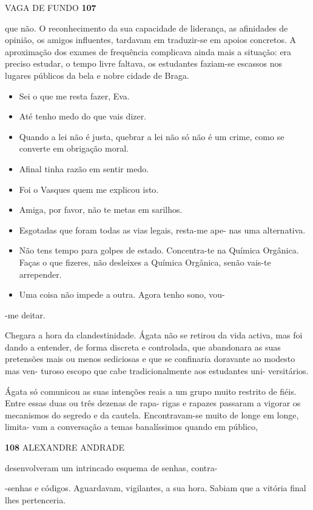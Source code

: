 VAGA DE FUNDO \textbf{107}

que não. O reconhecimento da sua capacidade de liderança, as afinidades
de opinião, os amigos influentes, tardavam em traduzir-se em apoios
concretos. A aproximação dos exames de frequência complicava ainda mais
a situação: era preciso estudar, o tempo livre faltava, os estudantes
faziam-se escassos nos lugares públicos da bela e nobre cidade de Braga.

\begin{itemize}
\tightlist
\item
  Sei o que me resta fazer, Eva.
\item
  Até tenho medo do que vais dizer.
\item
  Quando a lei não é justa, quebrar a lei não só não é um crime, como se
  converte em obrigação moral.
\item
  Afinal tinha razão em sentir medo.
\item
  Foi o Vasques quem me explicou isto.
\item
  Amiga, por favor, não te metas em sarilhos.
\item
  Esgotadas que foram todas as vias legais, resta-me ape- nas uma
  alternativa.
\item
  Não tens tempo para golpes de estado. Concentra-te na Química
  Orgânica. Faças o que fizeres, não desleixes a Química Orgânica, senão
  vais-te arrepender.
\item
  Uma coisa não impede a outra. Agora tenho sono, vou-
\end{itemize}

-me deitar.

Chegara a hora da clandestinidade. Ágata não se retirou da vida activa,
mas foi dando a entender, de forma discreta e controlada, que abandonara
as suas pretensões mais ou menos sediciosas e que se confinaria
doravante ao modesto mas ven- turoso escopo que cabe tradicionalmente
aos estudantes uni- versitários.

Ágata só comunicou as suas intenções reais a um grupo muito restrito de
fiéis. Entre essas duas ou três dezenas de rapa- rigas e rapazes
passaram a vigorar os mecanismos do segredo e da cautela. Encontravam-se
muito de longe em longe, limita- vam a conversação a temas banalíssimos
quando em público,

\textbf{108 }ALEXANDRE ANDRADE

desenvolveram um intrincado esquema de senhas, contra-

-senhas e códigos. Aguardavam, vigilantes, a sua hora. Sabiam que a
vitória final lhes pertenceria.

